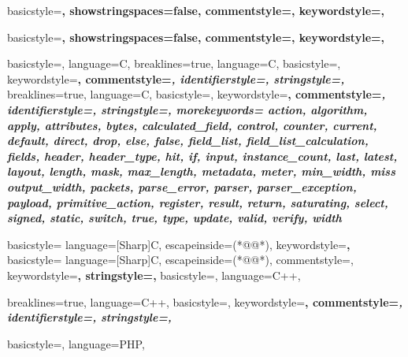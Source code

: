 \DeclareOldFontCommand{\bf}{\normalfont\bfseries}{\mathbf}
	{
	basicstyle=\scriptsize\bf\ttfamily,
	showstringspaces=false,
    commentstyle=\color{deepgreen},
    keywordstyle=\color{blue},
	}

	{
	basicstyle=\footnotesize\bf\ttfamily,
	showstringspaces=false,
    commentstyle=\color{deepgreen},
    keywordstyle=\color{blue},
	}
	
	{
	basicstyle=\scriptsize,
	language=C,
	}
	{
  	breaklines=true,
  	language=C,
  	basicstyle=\scriptsize,
  	keywordstyle=\bfseries\color{green!40!black},
  	commentstyle=\itshape\color{purple!40!black},
  	identifierstyle=\color{blue},
  	stringstyle=\color{orange},
    }
	{
  	breaklines=true,
  	language=C,
  	basicstyle=\scriptsize,
  	keywordstyle=\bfseries\color{green!40!black},
  	commentstyle=\itshape\color{purple!40!black},
  	identifierstyle=\color{blue},
  	stringstyle=\color{orange},
  	morekeywords={%
      action, algorithm, apply, attributes, bytes,
      calculated_field, control, counter, current, default, direct,
      drop, else, false, field_list, field_list_calculation, fields,
      header, header_type, hit, if, input, instance_count, last, latest,
      layout, length, mask, max_length, metadata, meter, min_width, miss
      output_width, packets, parse_error, parser, parser_exception, payload,
      primitive_action, register, result, return, saturating, select,
      signed, static, switch, true, type, update, valid, verify, width}
    }

	{
	basicstyle=\scriptsize
	language=[Sharp]C,
	escapeinside={(*@}{@*)},
	keywordstyle=\bfseries,
	}
	{
	basicstyle=\scriptsize
	language=[Sharp]C,
	escapeinside={(*@}{@*)},
	commentstyle=\color{greencomments},
	keywordstyle=\color{bluekeywords}\bfseries,
	stringstyle=\color{redstrings},
	}
	{
	basicstyle=\scriptsize,
	language=C++,
 	}
 	
	{
  	breaklines=true,
  	language=C++,
  	basicstyle=\scriptsize,
  	keywordstyle=\bfseries\color{green!40!black},
  	commentstyle=\itshape\color{purple!40!black},
  	identifierstyle=\color{blue},
  	stringstyle=\color{orange},
    }
    
	{
	basicstyle=\scriptsize,
	language=PHP,
	}
	
